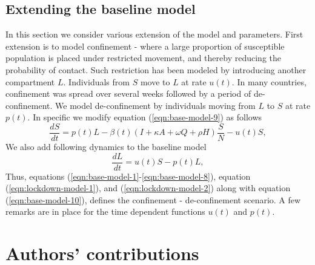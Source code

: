 \documentclass[authoryear,preprint]{elsarticle}
\begin{document}
\subsection{Extending the baseline model}
In this section we consider various extension of the model and parameters. First extension is to model confinement - where a large proportion of susceptible population is placed under restricted movement, and thereby reducing the probability of contact. Such restriction has been modeled by introducing another compartment $L$. Individuals from $S$ move to $L$ at rate $u(t)$. In many countries, confinement was spread over several weeks followed by a period of de-confinement. We model de-confinement by individuals moving from $L$ to $S$ at rate $p(t)$. In specific we modify equation (\ref{eqn:base-model-9}) as follows
\begin{equation}
\frac{dS}{dt} = p(t)L -\beta(t) \left( I + \kappa A + \omega Q + \rho H \right) \frac{S}{N} - u(t)S,
\label{eqn:lockdown-model-1}
\end{equation}
%
%
We also add following dynamics to the baseline model 
\begin{equation}
\frac{dL}{dt} = u(t)S - p(t)L,
\label{eqn:lockdown-model-2}
\end{equation}
Thus, equations (\ref{eqn:base-model-1}-\ref{eqn:base-model-8}), equation (\ref{eqn:lockdown-model-1}), and (\ref{eqn:lockdown-model-2}) along with equation (\ref{eqn:base-model-10}), defines the confinement - de-confinement scenario. A few remarks are in place for the time dependent functions $u(t)$ and $p(t)$.

\section*{Authors' contributions}
\label{SEC5}


	
\end{document}
